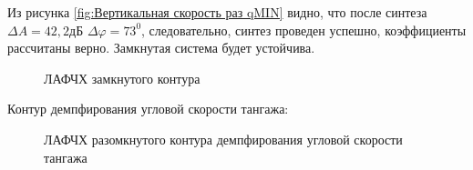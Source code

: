 Из рисунка \ref{fig:Вертикальная скорость раз qMIN} видно, что после синтеза $\Delta A = 42,2 $дБ $\Delta \varphi = 73^0$, следовательно, синтез проведен успешно, коэффициенты рассчитаны верно. Замкнутая система будет устойчива. 

\begin{figure}[H]
    \caption{ЛАФЧХ замкнутого контура }
    \label{fig:Вертикальная скорость зам qMIN}
\end{figure}

\begin{center}
    Контур демпфирования угловой скорости тангажа:
\end{center}

\begin{figure}[H]
    \caption{ЛАФЧХ разомкнутого контура демпфирования угловой скорости тангажа}
    \label{fig:Угловая скорость тангажа раз qMAX}
\end{figure}

